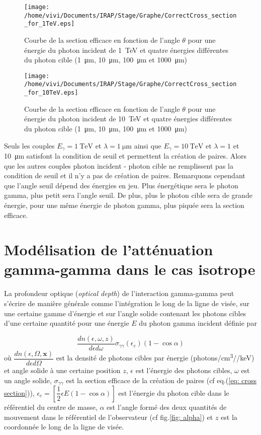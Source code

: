 \documentclass[a4paper,12pt,twoside]{article}
\begin{document}
\begin{figure}[H]
	\centering
    \texttt{[image: /home/vivi/Documents/IRAP/Stage/Graphe/CorrectCross\_section\_for\_1TeV.eps]}
    \caption{Courbe de la section efficace en fonction de l'angle $\theta$ pour une énergie du photon incident de \SI{1}{\TeV} et quatre énergies différentes du photon cible (\SI{1}{\micro\m}, \SI{10}{\micro\m}, \SI{100}{\micro\m} et \SI{1000}{\micro\m})}
    \label{1TeV}
\end{figure}

\begin{figure}[H]
	\centering
    \texttt{[image: /home/vivi/Documents/IRAP/Stage/Graphe/CorrectCross\_section\_for\_10TeV.eps]}
    \caption{Courbe de la section efficace en fonction de l'angle $\theta$ pour une énergie du photon incident de \SI{10}{\TeV} et quatre énergies différentes du photon cible (\SI{1}{\micro\m}, \SI{10}{\micro\m}, \SI{100}{\micro\m} et \SI{1000}{\micro\m})}
    \label{10TeV}
\end{figure}

Seuls les couples $E_\gamma = \SI{1}{\TeV}$ et $\lambda = \SI{1}{\micro\m}$ ainsi que $E_\gamma = \SI{10}{\TeV}$ et $\lambda = 1$ et \SI{10}{\micro\m} satisfont la condition de seuil et permettent la création de paires. Alors que les autres couples photon incident - photon cible ne remplissent pas la condition de seuil et il n'y a pas de création de paires. Remarquons cependant que l'angle seuil dépend des énergies en jeu. Plus énergétique sera le photon gamma, plus petit sera l'angle seuil. De plus, plus le photon cible sera de grande énergie, pour une même énergie de photon gamma, plus piquée sera la section efficace.

\section{Modélisation de l'atténuation gamma-gamma dans le cas isotrope}

La profondeur optique (\textit{optical depth}) de l'interaction gamma-gamma peut s'écrire de manière générale comme l'intégration le long de la ligne de visée, sur une certaine gamme d'énergie et sur l'angle solide contenant les photons cibles d'une certaine quantité pour une énergie $E$ du photon gamma incident définie par

\begin{equation}
	\frac{d n(\epsilon, \omega, z)}{d \epsilon d \omega} \sigma_{\gamma \gamma}(\epsilon_c) (1 - \cos \alpha)
    \label{eq: integrante}
\end{equation}
où $\dfrac{d n(\epsilon, \Omega, \textbf{x})}{d \epsilon d \Omega}$ est la densité de photons cibles par énergie (photons/\si{\cm^3}/\si{\sr}/\si{\keV}) et angle solide à une certaine position $z$, $\epsilon$ est l'énergie des photons cibles, $\omega$ est un angle solide,  $\sigma_{\gamma \gamma}$ est la section efficace de la création de paires (cf eq.(\ref{eq: cross section})), $\epsilon_c = [\dfrac{1}{2} \epsilon E (1 - \cos\alpha)]$ est l'énergie du photon cible dans le référentiel du centre de masse, $\alpha$ est l'angle formé des deux quantités de mouvement dans le référentiel de l'observateur (cf fig.\ref{fig: alpha}) et $z$ est la coordonnée le long de la ligne de visée.
\end{document}

